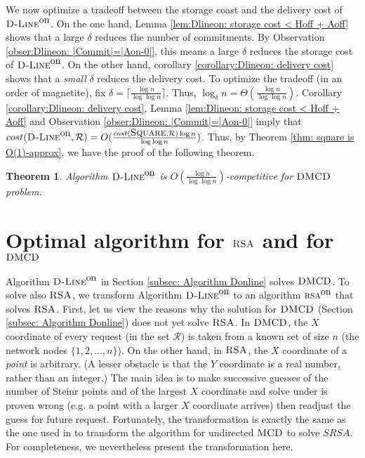 \documentclass[11pt]{article}
\newtheorem{theorem}{Theorem}[section]
\newcommand{\MCD}{\mbox{\sc MCD}}
\newcommand{\DMCD}{\mbox{\sc DMCD}}
\newcommand{\RSA}{\mbox{\sc RSA}}
\newcommand{\cost}[0]{cost}
\newcommand{\calR}{\mathcal{R}}
\newcommand{\onRSA}{\mbox{\sc rsa}^{\mbox{\upshape on}}}
\newcommand{\Square}[0]{\mbox{\sc Square}}
\newcommand{\Dlineon}[0]{\mbox{{\sc D-Line}}^{\mbox{\upshape on}}}
\begin{document}
We now optimize a tradeoff between the storage coast and the delivery cost of $\Dlineon$.
On the one hand, Lemma \ref{lem:Dlineon: storage cost < Hoff + Aoff} shows that a large $\delta$
reduces the number of commitments.
By Observation \ref{obser:Dlineon: |Commit|=|Aon-0|}, this means a large $\delta$ reduces the storage cost of $\Dlineon$.
On the other hand, corollary \ref{corollary:Dlineon: delivery cost} shows that a {\em small} $\delta$ reduces the delivery cost.
To optimize the tradeoff (in an order of magnetite), fix $\delta=\lceil\frac{\log n}{\log \log n}\rceil$.
Thus, $\log_\delta n=\Theta(\frac{\log n}{\log \log n})$.
Corollary \ref{corollary:Dlineon: delivery cost},
Lemma \ref{lem:Dlineon: storage cost < Hoff + Aoff} and Observation \ref{obser:Dlineon: |Commit|=|Aon-0|}
imply that $\cost(\Dlineon,\calR)=O( \frac{\cost(\Square,\calR)\log n}{\log \log n})$.
Thus, by Theorem \ref{thm: square is O(1)-approx}, we
have the proof of the following theorem.

\begin{theorem}
Algorithm
$\Dlineon$ is $O(\frac{\log n}{\log \log n})$-competitive for
$\DMCD$ problem.
\label{thm: Dlineon is frac(log n)(log log n) competitive}
\end{theorem}



\vspace{-0.3cm}
\section{Optimal algorithm for $\RSA$ and for $\DMCD$}
\label{subsec: optRSA}


\vspace{-0.2cm}

\noindent Algorithm $\Dlineon$ in Section \ref{subsec: Algorithm Donline} solves $\DMCD$.
To solve also $\RSA$, we transform Algorithm $\Dlineon$ to an algorithm $\onRSA$ that solves $\RSA$.
First, let us view the reasons why the  solution for $\DMCD$ (Section \ref{subsec: Algorithm Donline}) does not yet solve $\RSA$.
In $\DMCD$,  the $X$ coordinate of every request (in the set $\calR$) is taken from a known set of size $n$ (the network nodes $\{1,2, ... , n\}$).
On the other hand, in $\RSA$, the $X$ coordinate of a {\em point} is arbitrary.
(A lesser obstacle is that the $Y$ coordinate is a real number, rather than an integer.)
The main idea is to make successive guesses of the number of Steinr points and of the largest $X$ coordinate and solve under is proven wrong
(e.g. a point with a larger $X$ coordinate arrives) then readjust the guess for future request.
Fortunately, the transformation is exactly the same as the one used in \cite{KK2014TR,KK2014} to transform the algorithm for undirected $\MCD$ to solve $SRSA$.
For completeness, we nevertheless present the transformation here.
\end{document}
